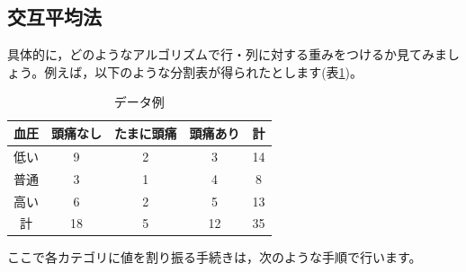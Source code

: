 \documentclass{ltjsbook}
\begin{document}
\subsection{交互平均法}
具体的に，どのようなアルゴリズムで行・列に対する重みをつけるか見てみましょう。例えば，以下のような分割表が得られたとします(表\ref{DAexample})。
\begin{table}[ht]
	\begin{center}
		\caption{データ例}
		\begin{tabular}{c|ccc|c}
			血圧 & 頭痛なし & たまに頭痛 & 頭痛あり & 計  \\
			\hline
			低い & 9    & 2     & 3    & 14 \\
			普通 & 3    & 1     & 4    & 8  \\
			高い & 6    & 2     & 5    & 13 \\
			\hline
			計  & 18   & 5     & 12   & 35 \\
		\end{tabular}
		\label{DAexample}
	\end{center}
\end{table}
ここで各カテゴリに値を割り振る手続きは，次のような手順で行います。
\end{document}
